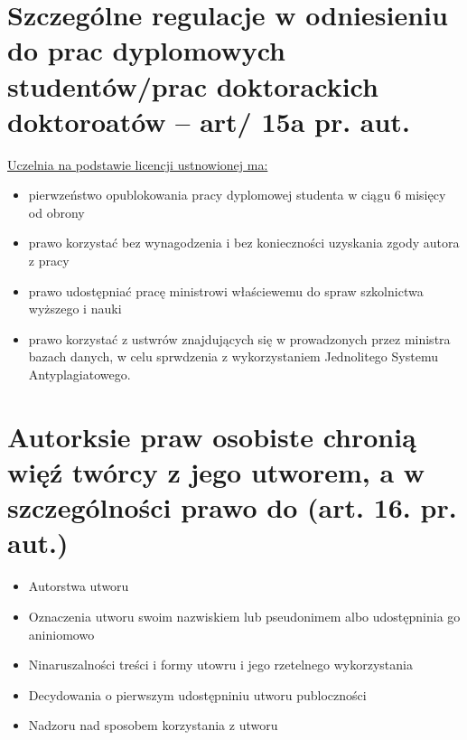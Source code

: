 \documentclass[11pt]{article}
\begin{document}
\section{Szczególne regulacje w odniesieniu do prac dyplomowych studentów/prac doktorackich doktoroatów -- art/ 15a pr. aut.}
\label{sec:org02f8291}
\uline{Uczelnia na podstawie licencji ustnowionej ma:}
\begin{itemize}
\item pierwzeństwo opublokowania pracy dyplomowej studenta w ciągu 6 misięcy od obrony
\item prawo korzystać bez wynagodzenia i bez konieczności uzyskania zgody autora z pracy
\item prawo udostępniać pracę ministrowi właściewemu do spraw szkolnictwa wyższego i nauki
\item prawo korzystać z ustwrów znajdujących się w prowadzonych przez ministra bazach danych, w celu sprwdzenia z wykorzystaniem Jednolitego Systemu Antyplagiatowego.
\end{itemize}
\section{Autorksie praw osobiste chronią więź twórcy z jego utworem, a w szczególności prawo do (art. 16. pr. aut.)}
\label{sec:org8bc2810}
\begin{itemize}
\item Autorstwa utworu
\item Oznaczenia utworu swoim nazwiskiem lub pseudonimem albo udostępninia go aniniomowo
\item Ninaruszalności treści i formy utowru i jego rzetelnego wykorzystania
\item Decydowania o pierwszym udostępniniu utworu publoczności
\item Nadzoru nad sposobem korzystania z utworu
\end{itemize}
\end{document}

